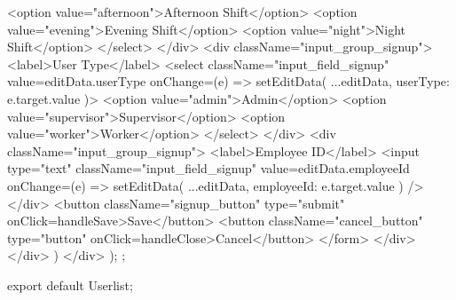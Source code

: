 {{                  <option value="afternoon">Afternoon Shift</option>
                  <option value="evening">Evening Shift</option>
                  <option value="night">Night Shift</option>
                </select>
              </div>
              <div className="input_group_signup">
                <label>User Type</label>
                <select className="input_field_signup" value={editData.userType} onChange={(e) => setEditData({ ...editData, userType: e.target.value })}>
                  <option value="admin">Admin</option>
                  <option value="supervisor">Supervisor</option>
                  <option value="worker">Worker</option>
                </select>
              </div>
              <div className="input_group_signup">
                <label>Employee ID</label>
                <input type="text" className="input_field_signup" value={editData.employeeId} onChange={(e) => setEditData({ ...editData, employeeId: e.target.value })} />
              </div>
              <button className="signup_button" type="submit" onClick={handleSave}>Save</button>
              <button className="cancel_button" type="button" onClick={handleClose}>Cancel</button>
            </form>
          </div>
        </div>
      )}
    </div>
  );
};

export default Userlist;
